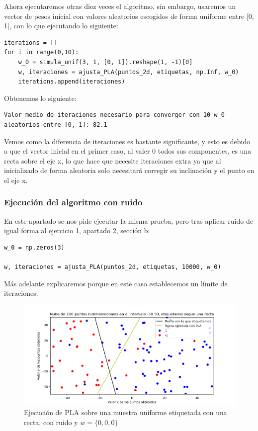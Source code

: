 \documentclass[12pt, spanish]{article}
\begin{document}
Ahora ejecutaremos otras diez veces el algoritmo, sin embargo, usaremos un vector de pesos inicial con valores aleatorios escogidos de forma uniforme entre [0, 1], con lo que ejecutando lo siguiente:

\begin{lstlisting}
iterations = []
for i in range(0,10):
	w_0 = simula_unif(3, 1, [0, 1]).reshape(1, -1)[0]
	w, iteraciones = ajusta_PLA(puntos_2d, etiquetas, np.Inf, w_0)
	iterations.append(iteraciones)
\end{lstlisting}

Obtenemos lo siguiente:

\begin{lstlisting}
Valor medio de iteraciones necesario para converger con 10 w_0 aleatorios entre [0, 1]: 82.1
\end{lstlisting}


Vemos como la diferencia de iteraciones es bastante significante, y esto es debido a que el vector inicial en el primer caso, al valer 0 todos sus componentes, es una recta sobre el eje x, lo que hace que necesite iteraciones extra ya que al inicializado de forma aleatoria solo necesitará corregir su inclinación y el punto en el eje x.


\subsubsection{Ejecución del algoritmo con ruido}

En este apartado se nos pide ejecutar la misma prueba, pero tras aplicar ruido de igual forma al ejercicio 1, apartado 2, sección b:

\begin{lstlisting}
w_0 = np.zeros(3)

w, iteraciones = ajusta_PLA(puntos_2d, etiquetas, 10000, w_0)
\end{lstlisting}

Más adelante explicaremos porque en este caso establecemos un límite de iteraciones.

\begin{figure}[H]
  \centering
      \includegraphics[scale = 0.70]{ej-2-PLA-ruido.png}
 		 \caption{Ejecución de PLA sobre una muestra uniforme etiquetada con una recta, con ruido y $w = \{0, 0, 0\}$}
  		\label{fig:ej2-PLA}

\end{figure}
\end{document}
